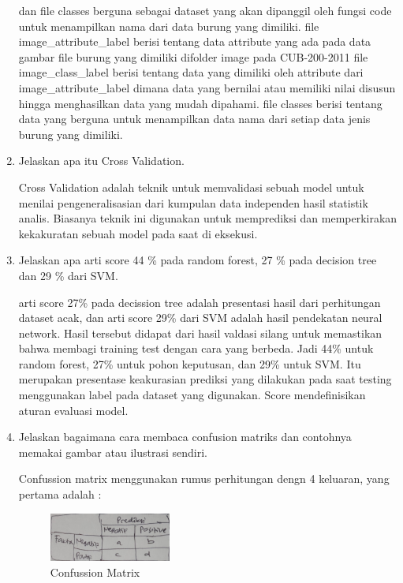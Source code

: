 \begin{enumerate}
        dan file classes berguna sebagai dataset yang akan dipanggil oleh fungsi code untuk menampilkan nama dari data burung yang dimiliki. file image\_attribute\_label
        berisi tentang data attribute yang ada pada data gambar file burung yang dimiliki difolder image pada CUB-200-2011
        file image\_class\_label
        berisi tentang data yang dimiliki oleh attribute dari image\_attribute\_label dimana data yang bernilai atau memiliki nilai disusun hingga menghasilkan data yang mudah dipahami.
        file classes
        berisi tentang data yang berguna untuk menampilkan data nama dari setiap data jenis burung yang dimiliki.
        \item Jelaskan apa itu Cross Validation. \par
        Cross Validation adalah teknik untuk memvalidasi sebuah model untuk menilai pengeneralisasian dari kumpulan data independen hasil statistik analis. Biasanya teknik ini digunakan untuk memprediksi dan memperkirakan kekakuratan sebuah model pada saat di eksekusi.
        \item Jelaskan apa arti score 44 \% pada random forest, 27 \% pada decision tree dan 29 \% dari SVM. \par
        arti score 27\% pada decission tree adalah presentasi hasil dari perhitungan dataset acak, dan arti score 29\% dari SVM adalah hasil pendekatan neural network.  Hasil tersebut didapat dari hasil valdasi silang untuk memastikan bahwa membagi training test dengan cara yang berbeda. Jadi 44\% untuk random forest, 27\% untuk pohon keputusan, dan 29\% untuk SVM. Itu merupakan presentase keakurasian prediksi yang dilakukan pada saat testing menggunakan label pada dataset yang digunakan. Score mendefinisikan aturan evaluasi model.
        \item Jelaskan bagaimana cara membaca confusion matriks dan contohnya memakai gambar atau ilustrasi sendiri. \par
        Confussion matrix menggunakan rumus perhitungan dengn 4 keluaran, yang pertama adalah :
        \begin{figure}[H]
            \includegraphics[width=4cm]{figures/1174040/chapter3/confusion.jpeg}
            \centering
            \caption{Confussion Matrix}
        \end{figure}
            \begin{itemize}

\end{itemize}
\end{enumerate}
